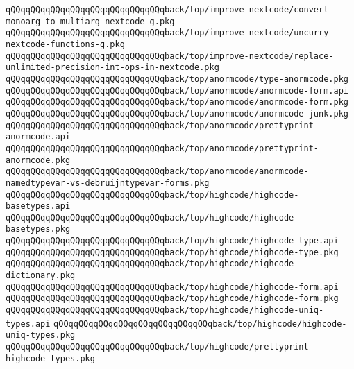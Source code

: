 \verb|qQQqqQQqqQQqqQQqqQQqqQQqqQQqqQQqback/top/improve-nextcode/convert-monoarg-to-multiarg-nextcode-g.pkg|\newline
\verb|qQQqqQQqqQQqqQQqqQQqqQQqqQQqqQQqback/top/improve-nextcode/uncurry-nextcode-functions-g.pkg|\newline
\verb|qQQqqQQqqQQqqQQqqQQqqQQqqQQqqQQqback/top/improve-nextcode/replace-unlimited-precision-int-ops-in-nextcode.pkg|\newline
\verb|qQQqqQQqqQQqqQQqqQQqqQQqqQQqqQQqback/top/anormcode/type-anormcode.pkg|\newline
\verb|qQQqqQQqqQQqqQQqqQQqqQQqqQQqqQQqback/top/anormcode/anormcode-form.api|\newline
\verb|qQQqqQQqqQQqqQQqqQQqqQQqqQQqqQQqback/top/anormcode/anormcode-form.pkg|\newline
\verb|qQQqqQQqqQQqqQQqqQQqqQQqqQQqqQQqback/top/anormcode/anormcode-junk.pkg|\newline
\verb|qQQqqQQqqQQqqQQqqQQqqQQqqQQqqQQqback/top/anormcode/prettyprint-anormcode.api|\newline
\verb|qQQqqQQqqQQqqQQqqQQqqQQqqQQqqQQqback/top/anormcode/prettyprint-anormcode.pkg|\newline
\verb|qQQqqQQqqQQqqQQqqQQqqQQqqQQqqQQqback/top/anormcode/anormcode-namedtypevar-vs-debruijntypevar-forms.pkg|\newline
\verb|qQQqqQQqqQQqqQQqqQQqqQQqqQQqqQQqback/top/highcode/highcode-basetypes.api|\newline
\verb|qQQqqQQqqQQqqQQqqQQqqQQqqQQqqQQqback/top/highcode/highcode-basetypes.pkg|\newline
\verb|qQQqqQQqqQQqqQQqqQQqqQQqqQQqqQQqback/top/highcode/highcode-type.api|\newline
\verb|qQQqqQQqqQQqqQQqqQQqqQQqqQQqqQQqback/top/highcode/highcode-type.pkg|\newline
\verb|qQQqqQQqqQQqqQQqqQQqqQQqqQQqqQQqback/top/highcode/highcode-dictionary.pkg|\newline
\verb|qQQqqQQqqQQqqQQqqQQqqQQqqQQqqQQqback/top/highcode/highcode-form.api|\newline
\verb|qQQqqQQqqQQqqQQqqQQqqQQqqQQqqQQqback/top/highcode/highcode-form.pkg|\newline
\verb|qQQqqQQqqQQqqQQqqQQqqQQqqQQqqQQqback/top/highcode/highcode-uniq-types.api|\newline
\verb|qQQqqQQqqQQqqQQqqQQqqQQqqQQqqQQqback/top/highcode/highcode-uniq-types.pkg|\newline
\verb|qQQqqQQqqQQqqQQqqQQqqQQqqQQqqQQqback/top/highcode/prettyprint-highcode-types.pkg|\newline
